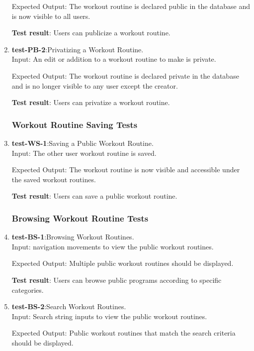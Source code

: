 \documentclass[12pt, titlepage]{article}
\begin{document}
\begin{enumerate}
    Expected Output: The workout routine is declared public in the database and is now visible to all users.
    
    \textbf{Test result}: Users can publicize a workout routine.
   
    \item{\textbf{test-PB-2}}:Privatizing a Workout Routine.\\
    Input: An edit or addition to a workout routine to make is private.
	
    Expected Output: The workout routine is declared private in the database and is no longer visible to any user except the creator.
    
    \textbf{Test result}: Users can privatize a workout routine.
   
\subsubsection{Workout Routine Saving Tests}
    \item{\textbf{test-WS-1}}:Saving a Public Workout Routine.\\
    Input: The other user workout routine is saved.
	
    Expected Output: The workout routine is now visible and accessible under the saved workout routines.
    
    \textbf{Test result}: Users can save a public workout routine.
   
\subsubsection{Browsing Workout Routine Tests}
    \item{\textbf{test-BS-1}}:Browsing Workout Routines.\\
    Input: navigation movements to view the public workout routines.
	
    Expected Output: Multiple public workout routines should be displayed.
     
    \textbf{Test result}: Users can browse public programs according to specific categories.
   
    \item{\textbf{test-BS-2}}:Search Workout Routines.\\
    Input: Search string inputs to view the public workout routines.
	
    Expected Output: Public workout routines that match the search criteria should be displayed. 
    

\end{enumerate}
\end{document}
